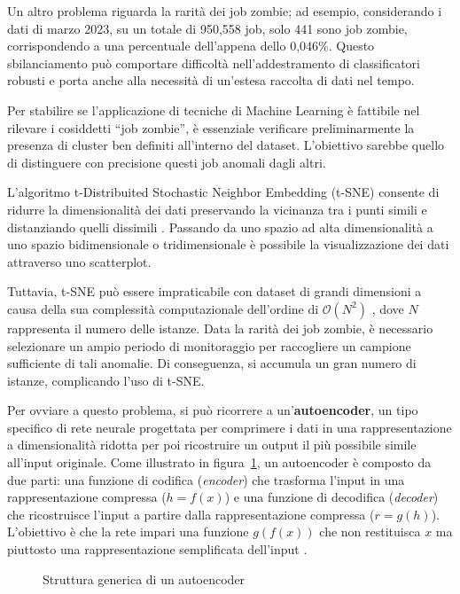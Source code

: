 Un altro problema riguarda la rarità dei job zombie; ad esempio, considerando
i dati di marzo 2023, su un totale di 950,558 job, solo 441 sono job zombie,
corrispondendo a una percentuale dell'appena dello 0,046\%. Questo
sbilanciamento può comportare difficoltà nell'addestramento di classificatori
robusti e porta anche alla necessità di un'estesa raccolta di dati nel tempo.

Per stabilire se l'applicazione di tecniche di Machine Learning è fattibile
nel rilevare i cosiddetti ``job zombie'', è essenziale verificare
preliminarmente la presenza di cluster ben definiti all'interno del dataset.
L'obiettivo sarebbe quello di distinguere con precisione questi job anomali
dagli altri. 

L'algoritmo t-Distribuited Stochastic Neighbor Embedding (t-SNE) consente di
ridurre la dimensionalità dei dati preservando la vicinanza tra i punti simili
e distanziando quelli dissimili \cite{vanderMaaten2008}. Passando da uno
spazio ad alta dimensionalità a uno spazio bidimensionale o tridimensionale è
possibile la visualizzazione dei dati attraverso uno scatterplot.

Tuttavia, t-SNE può essere impraticabile con dataset di grandi dimensioni a
causa della sua complessità computazionale dell'ordine di $\mathcal{O}(N^2)$
\cite{Pezzotti2017}, dove $N$ rappresenta il numero delle istanze. Data la
rarità dei job zombie, è necessario selezionare un ampio periodo di
monitoraggio per raccogliere un campione sufficiente di tali anomalie. Di
conseguenza, si accumula un gran numero di istanze, complicando l'uso di
t-SNE.

Per ovviare a questo problema, si può ricorrere a un'\textbf{autoencoder}, un
tipo specifico di rete neurale progettata per comprimere i dati in una
rappresentazione a dimensionalità ridotta per poi ricostruire un output il più
possibile simile all'input originale. Come illustrato in
figura~\ref{fig:structure_autoencoder}, un autoencoder è composto da due parti:
una funzione di codifica (\textit{encoder}) che trasforma l'input in una
rappresentazione compressa ($h=f(x)$) e una funzione di decodifica
(\textit{decoder}) che ricostruisce l'input a partire dalla rappresentazione
compressa ($r=g(h)$). L'obiettivo è che la rete impari una funzione $g(f(x))$
che non restituisca $x$ ma piuttosto una rappresentazione semplificata
dell'input \cite{Goodfellow2016}.

\begin{figure}[!ht]
    \centering
    \caption{Struttura generica di un autoencoder \cite{Goodfellow2016}} 
    \label{fig:structure_autoencoder}
\end{figure}

